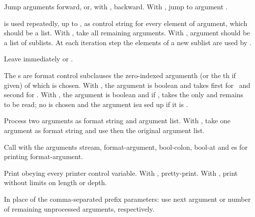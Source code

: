 \begin{LIST}{1cm}
\begin{LIST}{.5cm}
    {
    Jump  arguments forward, or, with \kwd{:}, backward. With
    , jump to argument .
  }

    {
     is used repeatedly, up to , as control
    string for every element of argument, which should be a list. With
    , take all remaining arguments. With \kwd{:}, argument should be
    a list of sublists. At each iteration step the elements of a new
    sublist are used by . 
  }

    \IT{\KWD{\TLD\^{}}}
    {
    Leave immediately \kwd{\TLD\boldmath{$<$} \TLD\boldmath{$>$}} or
    \kwd{\TLD\boldmath{$\{$} \TLD\boldmath{$\}$}}.
  }

    {
    The s are format control subclauses the zero-indexed argumenth (or the
    th if given) of which is chosen. With \kwd{:}, the argument
    is boolean and takes first  for \NIL\ and second
     for \T. With , the argument is boolean and if \T, takes
    the only  and remains to be read; no  is
    chosen and the argument isu sed up if it is \NIL.
  }

    {
    Process two arguments as format string and argument list. With
    , take one argument as format string and use then the
    original argument list.
  }

    {
    Call  with the arguments stream, format-ar\-gu\-ment,
    bool-colon, bool-at and es for printing format-argument.
  }

    {
    Print obeying every printer control variable. With \kwd{:},
    pretty-print. With , print without limits on length or depth.
  }

    {
    In place of the comma-separated prefix parameters: use next
    argument or number of remaining unprocessed arguments, respectively.
  }

  \end{LIST}

\end{LIST}


